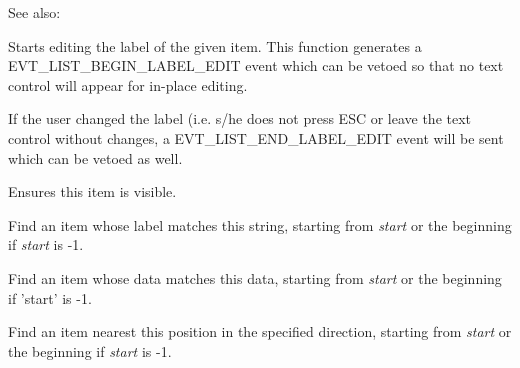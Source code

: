 See also: 


\label{wxlistctrledit}


Starts editing the label of the given item. This function generates a
EVT\_LIST\_BEGIN\_LABEL\_EDIT event which can be vetoed so that no
text control will appear for in-place editing.

If the user changed the label (i.e. s/he does not press ESC or leave
the text control without changes, a EVT\_LIST\_END\_LABEL\_EDIT event
will be sent which can be vetoed as well.


\label{wxlistctrlensurevisible}


Ensures this item is visible.


\label{wxlistctrlfinditem}


Find an item whose label matches this string, starting from {\it start} or
the beginning if {\it start} is -1.


Find an item whose data matches this data, starting from {\it start} or
the beginning if 'start' is -1.


Find an item nearest this position in the specified direction, starting from 
{\it start} or the beginning if {\it start} is -1.




